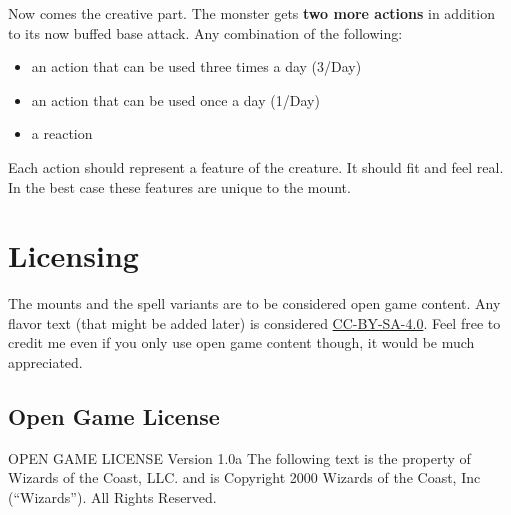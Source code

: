 \documentclass[letterpaper,twocolumn,openany,nodeprecatedcode]{dndbook}
\begin{document}
Now comes the creative part.
The monster gets \textbf{two more actions} in addition to its now buffed base attack.
Any combination of the following:
\begin{itemize}
  \item an action that can be used three times a day (3/Day)
  \item an action that can be used once a day (1/Day)
  \item a reaction
\end{itemize}

Each action should represent a feature of the creature.
It should fit and feel real.
In the best case these features are unique to the mount.

\chapter{Licensing}

The mounts and the spell variants are to be considered open game content. Any flavor text (that might be added later) is considered \href{https://creativecommons.org/licenses/by-sa/4.0/legalcode}{CC-BY-SA-4.0}. Feel free to credit me even if you only use open game content though, it would be much appreciated.

\section{Open Game License}

OPEN GAME LICENSE Version 1.0a The following text is the property of Wizards of the Coast, LLC. and is Copyright 2000 Wizards of the Coast, Inc (“Wizards”). All Rights Reserved.
\end{document}
